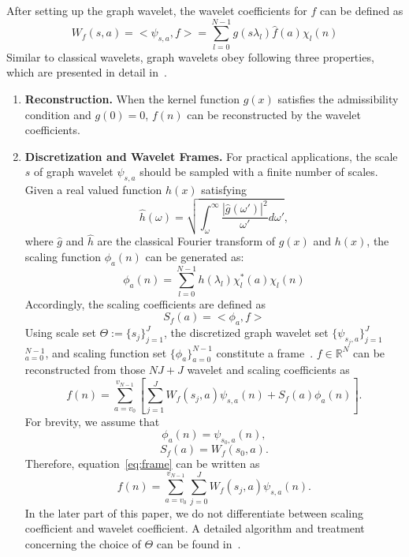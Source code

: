 \noindent
After setting up the graph wavelet, the wavelet coefficients for $f$ can be defined as
\begin{equation}
\label{eq:graph_graphwavelet}
W_f(s,a)=<\psi_{s,a}, f>=\sum\limits_{l=0}^{N-1}g(s\lambda_l)\hat{f}(a)\chi_l(n)
\end{equation}
Similar to classical wavelets, graph wavelets obey following three properties, which are presented in detail in~\cite{hammond2011wavelets}.
 \begin{enumerate}
 \item \textbf{Reconstruction.}
 When the kernel function $g(x)$ satisfies the admissibility condition and $g(0)=0$,  $f(n)$ can be reconstructed by the wavelet coefficients.
\item \textbf{Discretization and Wavelet Frames.} For practical applications, the
scale $s$ of graph wavelet $\psi_{s,a}$ should be sampled with a finite number of scales. Given a real valued function $h(x)$ satisfying
\begin{equation}
\hat{h}(\omega) = \sqrt{\int_\omega^\infty\frac{|\hat{g}(\omega')|^2}{\omega'}d{\omega'} },
\end{equation}
where $\hat{g}$ and $\hat{h}$ are the classical Fourier transform of $g(x)$ and $h(x)$, the scaling function $\phi_{a}(n)$ can be generated as:
\begin{equation}
\label{eq:graphscaledefinition}
\phi_{a}(n) = \sum\limits_{l=0}^{N-1}h(\lambda_l)\chi_l^*(a)\chi_l(n)
\end{equation}
Accordingly, the scaling coefficients are defined as
\begin{equation}
S_f(a)=<\phi_a,f>
\end{equation}
Using scale set $\Theta:=\{s_j\}_{j=1}^J$, the discretized graph wavelet set $\{\psi_{s_j,a}\}_{j=1}^{J}$ $_{a=0}^{N-1}$, and scaling function set $\{\phi_a\}_{a=0}^{N-1}$ constitute a frame~\cite{hammond2011wavelets}.
$f\in \mathbb{R}^N$ can be reconstructed from those $NJ+J$ wavelet and scaling coefficients as
\begin{equation}
\label{eq:frame}
f(n)=\sum_{a=v_0}^{v_{N-1}}[\sum_{j=1}^{J}W_{f}(s_j,a)\psi_{s,a}(n)+S_f(a)\phi_{a}(n)].
\end{equation}For brevity, we assume that
\begin{equation}
\phi_a(n)=\psi_{s_0,a}(n),
\end{equation}
\begin{equation}
S_f(a)=W_f(s_0,a).
\end{equation}Therefore, equation~\ref{eq:frame} can be written as
\begin{equation}
\label{eq:frame2}
f(n)=\sum_{a=v_0}^{v_{N-1}}\sum_{j=0}^{J}W_{f}(s_j,a)\psi_{s,a}(n).
\end{equation}In the later part of this paper, we do not differentiate between
scaling coefficient and wavelet coefficient.
A detailed algorithm and treatment concerning the choice of $\Theta$ can be found in~\cite{hammond2011wavelets}.


\end{enumerate}
